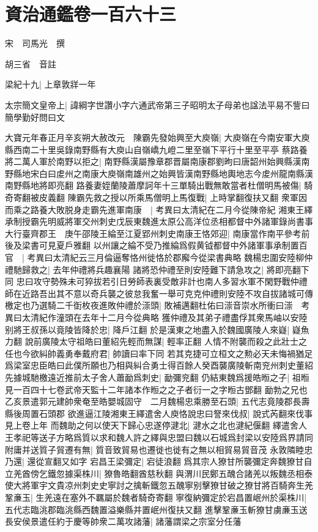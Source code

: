\chapter{資治通鑑卷一百六十三}
宋　司馬光　撰

胡三省　音註

梁紀十九|{
	上章敦牂一年}


太宗簡文皇帝上|{
	諱綱字世讚小字六通武帝第三子昭明太子母弟也諡法平易不訾曰簡學勤好問曰文}


大寶元年春正月辛亥朔大赦改元　陳霸先發始興至大庾嶺|{
	大庾嶺在今南安軍大庾縣西南二十里吳錄南野縣有大庾山自嶺嶠九嶝二里至嶺下平行十里至平亭}
蔡路養將二萬人軍於南野以拒之|{
	南野縣漢屬豫章郡晋屬南康郡劉昫曰唐韶州始興縣漢南野縣地宋白曰䖍州之南康大庾嶺南雄州之始興皆漢南野縣地輿地志今䖍州龍南縣漢南野縣地將即亮翻}
路養妻姪蘭陵蕭摩訶年十三單騎出戰無敢當者杜僧明馬被傷|{
	騎奇寄翻被皮義翻}
陳霸先救之授以所乘馬僧明上馬復戰|{
	上時掌翻復扶又翻}
衆軍因而乘之路養大敗脱身走霸先進軍南康　|{
	考異曰太清紀在二月今從陳帝紀}
湘東王繹承制授霸先明威將軍交州刺史戊辰東魏進太原公高洋位丞相都督中外諸軍錄尚書事大行臺齊郡王　庚午邵陵王綸至江夏郢州刺史南康王恪郊迎|{
	南康當作南平參考前後及梁書可見夏戶雅翻}
以州讓之綸不受乃推綸爲假黄钺都督中外諸軍事承制置百官　|{
	考異曰太清紀云三月倫逼奪恪州徙恪於郡廨今從梁書典略}
魏楊忠圍安陸柳仲禮馳歸救之|{
	去年仲禮將兵趣襄陽}
諸將恐仲禮至則安陸難下請急攻之|{
	將即亮翻下同}
忠曰攻守勢殊未可猝拔若引日勞師表裏受敵非計也南人多習水軍不閑野戰仲禮師在近路吾出其不意以奇兵襲之彼怠我奮一舉可克克仲禮則安陸不攻自拔諸城可傳檄定也乃選騎二千衘枚夜進敗仲禮於漴頭|{
	敗補邁翻杜佑曰漴音崇水所衝曰漴　考異曰太清紀作潼頭在去年十二月今從典略}
獲仲禮及其弟子禮盡俘其衆馬岫以安陸别將王叔孫以竟陵皆降於忠|{
	降戶江翻}
於是漢東之地盡入於魏國廣陵人來嶷|{
	嶷魚力翻}
說前廣陵太守祖皓曰董紹先輕而無謀|{
	輕率正翻}
人情不附襲而殺之此壯士之任也今欲糾帥義勇奉戴府君|{
	帥讀曰率下同}
若其克捷可立桓文之勲必天未悔禍猶足爲梁室忠臣皓曰此僕所願也乃相與糾合勇士得百餘人癸酉襲廣陵斬南兖州刺史董紹先據城馳檄遠近推前太子舍人蕭勔爲刺史|{
	勔彌兖翻}
仍結東魏爲援皓暅之子|{
	祖暅見一百四十七卷武帝天監十二年諸本作暅之之子者衍一之字暅古鄧翻}
勔勃之兄也乙亥景遣郭元建帥衆奄至皓嬰城固守　二月魏楊忠乘勝至石頭|{
	五代志竟陵郡長壽縣後周置石頭郡}
欲進逼江陵湘東王繹遣舍人庾恪說忠曰詧來伐叔|{
	說式芮翻來伐事見上卷上年}
而魏助之何以使天下歸心忠遂停湕北|{
	湕水之北也湕紀偃翻}
繹遣舍人王孝祀等送子方略爲質以求和魏人許之繹與忠盟曰魏以石城爲封梁以安陸爲界請同附庸并送質子貿遷有無|{
	質音致貿易也遷徙也徙有之無以相貿易貿音茂}
永敦隣睦忠乃還|{
	還從宣翻又如字}
宕昌王梁彌定|{
	宕徒浪翻}
爲其宗人獠甘所襲彌定奔魏獠甘自立羌酋傍乞鐵忽據渠株川|{
	獠魯皓翻酋慈秋翻}
與渭川民鄭五醜合諸羌以叛魏丞相泰使大將軍宇文貴凉州刺史史寧討之擒斬鐵忽五醜寧别擊獠甘破之獠甘將百騎奔生羌鞏亷玉|{
	生羌遠在塞外不羈屬於魏者騎奇寄翻}
寧復納彌定於宕昌置岷州於渠株川|{
	五代志臨洮郡臨洮縣西魏置溢樂縣并置岷州復扶又翻}
進擊鞏亷玉斬獠甘虜亷玉送長安侯景遣任約于慶等帥衆二萬攻諸藩|{
	諸藩謂梁之宗室分任藩}


